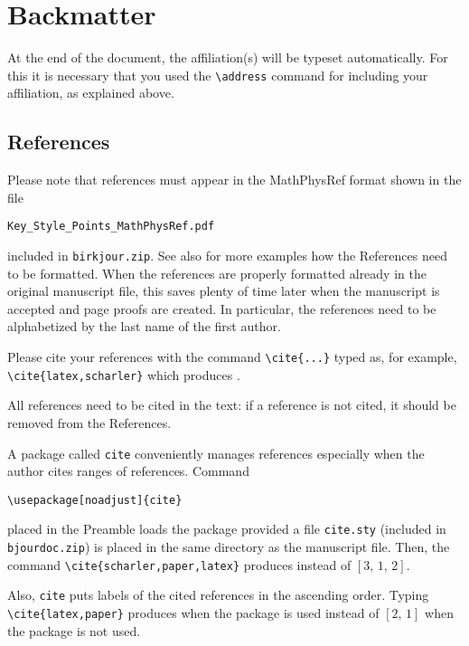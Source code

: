 \documentclass{birkjour}
\theoremstyle{definition}
\theoremstyle{remark}
\numberwithin{equation}{section}
\begin{document}

\section{Backmatter}

At the end of the document, the affiliation(s) will be typeset
automatically. For this it is necessary that you used the \verb+\address+ command for including your affiliation, as explained above.

\subsection{References}

Please note that references must appear in the MathPhysRef format shown in the file 
\begin{center}
\texttt{Key\_Style\_Points\_MathPhysRef.pdf}
\end{center}
included in \texttt{birkjour.zip}. See also   \cite{keystylepoints} for more examples how the References need to be formatted. When the references are properly formatted already in the original manuscript file, this saves plenty of time later when the manuscript is accepted and page proofs are created. In particular, the references need to be alphabetized by the last name of the first author. 

Please cite your references with the command \verb+\cite{...}+ typed as, for example, \verb+\cite{latex,scharler}+ which produces \cite{latex,scharler}.

All references need to be cited in the text: if a reference is not cited, it should be removed from the References.

A package called \verb+cite+ conveniently manages references especially when the author cites ranges of references. Command
\begin{verbatim}
\usepackage[noadjust]{cite}
\end{verbatim}
placed in the Preamble loads the package provided a file \verb+cite.sty+ 
(included in \texttt{bjourdoc.zip}) is placed in the same directory as the manuscript file.  Then, the command \verb+\cite{scharler,paper,latex}+ produces 
\cite{scharler,paper,latex} instead of $[3,\,1,\,2]$. 

Also, \texttt{cite} puts labels of the cited references in the ascending order. Typing \verb+\cite{latex,paper}+ produces \cite{latex,paper} when the package is used instead of $[2,\,1]$ when the package is not used.
\end{document}
